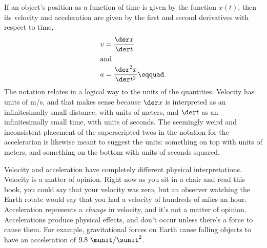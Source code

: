 If an object's position as a function of time is given by the function $x(t)$,
then its velocity and acceleration are given by the first and second derivatives
with respect to time,
\begin{align*}
  v &= \frac{\der x}{\der t} \\
\intertext{and}
  a &= \frac{\der^2 x}{\der t^2}\eqquad.
\end{align*}
The notation relates in a logical way to the units of the quantities. Velocity
has units of m/s, and that makes sense because $\der x$ is interpreted as an
infinitesimally small distance, with units of meters, and $\der t$ as an infinitesimally
small time, with units of seconds. The seemingly weird and inconsistent placement of the superscripted twos
in the notation for the acceleration is likewise meant to suggest the units: something on
top with units of meters, and something on the bottom with units of seconds squared.

Velocity and acceleration have completely different physical interpretations.
Velocity is a matter of opinion. Right now as you sit in a chair and read this book,
you could say that your velocity was zero, but an observer watching the Earth rotate
would say that you had a velocity of hundreds of miles an hour. Acceleration represents
a \emph{change} in velocity, and it's not a matter of opinion. Accelerations produce
physical effects, and don't occur unless there's a force to cause them. For example,
gravitational forces on Earth cause falling objects to have an acceleration of $9.8\ \munit/\sunit^2$.

\vspace{0mm plus 15mm}

